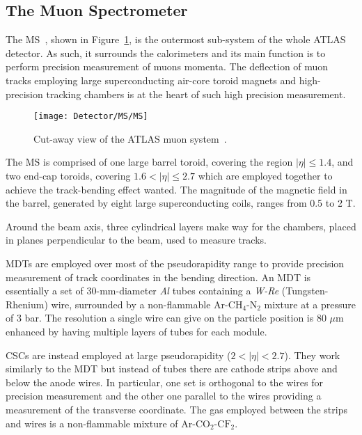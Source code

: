 		\subsection{The Muon Spectrometer}
		\label{sec:MuSpec}

			The \ac{MS}~\cite{MSTDR}, shown in Figure~\ref{fig:MS}, is the outermost sub-system of the whole \ac{ATLAS} detector. As such, it surrounds the calorimeters and its main function is to perform precision measurement of muons momenta. The deflection of muon tracks employing large superconducting air-core toroid magnets and high-precision tracking chambers is at the heart of such high precision measurement. 

			\begin{figure}[!htb]
				\centering
				\texttt{[image: Detector/MS/MS]}
				\caption{Cut-away view of the \ac{ATLAS} muon system~\cite{ATLASJINST}.}
				\label{fig:MS}
			\end{figure}

			The \ac{MS} is comprised of one large barrel toroid, covering the region $\left| \eta \right | \leq 1.4$, and two end-cap toroids, covering $1.6 < \left| \eta \right| \leq 2.7$ which are employed together to achieve the track-bending effect wanted. The magnitude of the magnetic field in the barrel, generated by eight large superconducting coils, ranges from 0.5 to 2 T. 

			Around the beam axis, three cylindrical layers make way for the chambers, placed in planes perpendicular to the beam, used to measure tracks. 

			\ac{MDTs} are employed over most of the pseudorapidity range to provide precision measurement of track coordinates in the bending direction. An MDT is essentially a set of 30-mm-diameter \emph{Al} tubes containing a \emph{W-Re} (Tungsten-Rhenium) wire, surrounded by a non-flammable $\mathrm{Ar}$-$\mathrm{CH_4}$-$\mathrm{N_2}$ mixture at a pressure of 3 bar. The resolution a single wire can give on the particle position is 80 $\mu$m enhanced by having multiple layers of tubes for each module.
			
			\ac{CSCs} are instead employed at large pseudorapidity ($2 < \left | \eta \right | < 2.7$). They work similarly to the MDT but instead of tubes there are cathode strips above and below the anode wires. In particular, one set is orthogonal to the wires for precision measurement and the other one parallel to the wires providing a measurement of the transverse coordinate. The gas employed between the strips and wires is a non-flammable mixture of $\mathrm{Ar}$-$\mathrm{CO_2}$-$\mathrm{CF_2}$.

